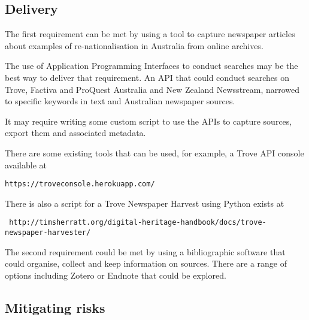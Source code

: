 \documentclass{article}
\begin{document}
\subsection*{Delivery}

The first requirement can be met by using a tool to capture newspaper articles about examples of re-nationalisation in Australia from online archives.\par

The use of Application Programming Interfaces to conduct searches may be the best way to deliver that requirement. An API that could conduct searches on Trove, Factiva and ProQuest Australia and New Zealand Newsstream, narrowed to specific keywords in text and Australian newspaper sources.\par
It may require writing some custom script to use the APIs to capture sources, export them and associated metadata.\par 
There are some existing tools that can be used, for example, a Trove API console available at \begin{verbatim}https://troveconsole.herokuapp.com/\end{verbatim} There is also a script for a Trove Newspaper Harvest using Python exists at \begin{verbatim} http://timsherratt.org/digital-heritage-handbook/docs/trove-newspaper-harvester/\end{verbatim}

The second requirement could be met by using a bibliographic software that could organise, collect and keep information on sources. There are a range of options including Zotero or Endnote that could be explored.\par

\subsection*{Mitigating risks}
\end{document}

